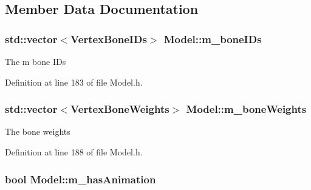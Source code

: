 \subsection{Member Data Documentation}
\subsubsection[{\texorpdfstring{m\+\_\+bone\+I\+Ds}{m_boneIDs}}]{\setlength{\rightskip}{0pt plus 5cm}std\+::vector$<${\bf Vertex\+Bone\+I\+Ds}$>$ Model\+::m\+\_\+bone\+I\+Ds\hspace{0.3cm}{\ttfamily [private]}}\hypertarget{class_model_a72f6e571825db39cd4b2308b7bdc9579}{}\label{class_model_a72f6e571825db39cd4b2308b7bdc9579}


The m bone I\+Ds 



Definition at line 183 of file Model.\+h.

\subsubsection[{\texorpdfstring{m\+\_\+bone\+Weights}{m_boneWeights}}]{\setlength{\rightskip}{0pt plus 5cm}std\+::vector$<${\bf Vertex\+Bone\+Weights}$>$ Model\+::m\+\_\+bone\+Weights\hspace{0.3cm}{\ttfamily [private]}}\hypertarget{class_model_a8b566d004af5119df6c58068c2bfaf35}{}\label{class_model_a8b566d004af5119df6c58068c2bfaf35}


The bone weights 



Definition at line 188 of file Model.\+h.

\subsubsection[{\texorpdfstring{m\+\_\+has\+Animation}{m_hasAnimation}}]{\setlength{\rightskip}{0pt plus 5cm}bool Model\+::m\+\_\+has\+Animation\hspace{0.3cm}{\ttfamily [private]}}\hypertarget{class_model_a714b5b200199ff7b8693377a2fe84104}{}\label{class_model_a714b5b200199ff7b8693377a2fe84104}


